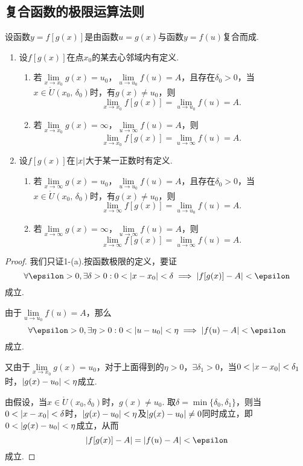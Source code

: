 \subsection{复合函数的极限运算法则}
\begin{theorem}
设函数\(y=f[g(x)]\)是由函数\(u=g(x)\)与函数\(y=f(u)\)复合而成.
\begin{enumerate}
\item 设\(f[g(x)]\)在点\(x_0\)的某去心邻域内有定义.
\begin{enumerate}
\item 若\(\lim\limits_{x \to x_0} g(x) = u_0\)，\(\lim\limits_{u \to u_0} f(u) = A\)，且存在\(\delta_0 > 0\)，当\(x \in \mathring{U}(x_0,\,\delta_0)\)时，有\(g(x) \neq u_0\)，则\[
\lim\limits_{x \to x_0} f[g(x)] = \lim\limits_{u \to u_0} f(u) = A.
\]
\item 若\(\lim\limits_{x \to x_0}g(x) = \infty\)，\(\lim\limits_{u \to \infty}f(u) = A\)，则\[
\lim\limits_{x \to x_0} f[g(x)] = \lim\limits_{u \to \infty} f(u) = A.
\]
\end{enumerate}
\item 设\(f[g(x)]\)在\(\abs{x}\)大于某一正数时有定义.
\begin{enumerate}
\item 若\(\lim\limits_{x \to \infty} g(x) = u_0\)，\(\lim\limits_{u \to u_0} f(u) = A\)，且存在\(\delta_0 > 0\)，当\(x \in \mathring{U}(x_0,\,\delta_0)\)时，有\(g(x) \neq u_0\)，则\[
\lim\limits_{x \to \infty} f[g(x)] = \lim\limits_{u \to u_0} f(u) = A.
\]
\item 若\(\lim\limits_{x \to \infty}g(x) = \infty\)，\(\lim\limits_{u \to \infty}f(u) = A\)，则\[
\lim\limits_{x \to \infty} f[g(x)] = \lim\limits_{u \to \infty} f(u) = A.
\]
\end{enumerate}
\end{enumerate}
\begin{proof}
我们只证1-(a).按函数极限的定义，要证\[
\forall\epsilon>0, \exists\delta>0 :
0 < \abs{x - x_0} < \delta
\implies
\abs{ f[g(x)] - A } < \epsilon
\]成立.

由于\(\lim\limits_{u \to u_0} f(u) = A\)，那么\[
\forall\epsilon>0, \exists\eta>0 :
0 < \abs{u - u_0} < \eta
\implies
\abs{ f(u) - A } < \epsilon
\]成立.

又由于\(\lim\limits_{x \to x_0} g(x) = u_0\)，对于上面得到的\(\eta > 0\)，\(\exists \delta_1 > 0\)，当\(0 < \abs{x - x_0} < \delta_1\)时，\(\abs{ g(x) - u_0 } < \eta\)成立.

由假设，当\(x \in \mathring{U}(x_0,\delta_0)\)时，\(g(x) \neq u_0\).
取\(\delta = \min\{\delta_0,\delta_1\}\)，则当\(0 < \abs{x - x_0} < \delta\)时，\(\abs{ g(x) - u_0 } < \eta\)及\(\abs{ g(x) - u_0 } \neq 0\)同时成立，即\(0 < \abs{ g(x) - u_0 } < \eta\)成立，从而\[
\abs{ f[g(x)] - A } = \abs{ f(u) - A } < \epsilon
\]成立.
\end{proof}
\end{theorem}

